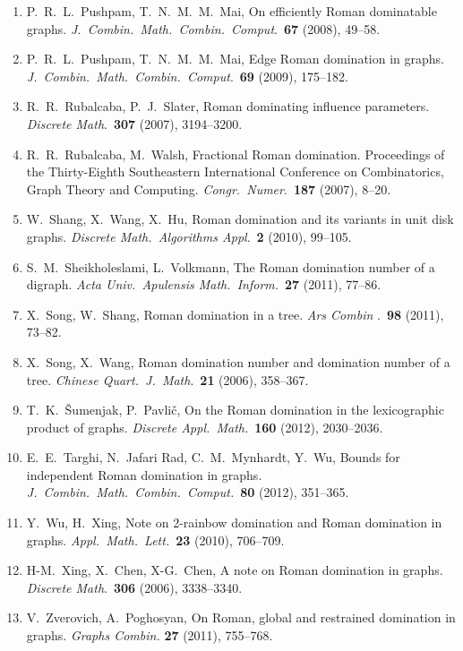 \documentclass[12pt]{article}%
\begin{document}
\begin{enumerate}
\item P.~R.~L.~Pushpam, T.~N.~M.~M.~Mai, On efficiently Roman dominatable
graphs. \emph{J.~Combin.~Math.~Combin.~Comput}.~\textbf{67} (2008), 49--58.

\item P.~R.~L.~Pushpam, T.~N.~M.~M.~Mai, Edge Roman domination in graphs.
\emph{J.~Combin.~Math.~Combin.~Comput}.~\textbf{69} (2009), 175--182.

\item R.~R.~Rubalcaba, P.~J.~Slater, Roman dominating influence parameters.
\emph{Discrete Math}.~\textbf{307} (2007), 3194--3200.

\item R.~R.~Rubalcaba, M.~Walsh, Fractional Roman domination. Proceedings of
the Thirty-Eighth Southeastern International Conference on Combinatorics,
Graph Theory and Computing. \emph{Congr.~Numer}.~\textbf{187} (2007), 8--20.

\item W.~Shang, X.~Wang, X.~Hu, Roman domination and its variants in unit disk
graphs. \emph{Discrete Math.~Algorithms Appl}.~\textbf{2} (2010), 99--105.

\item S.~M.~Sheikholeslami, L.~Volkmann, The Roman domination number of a
digraph. \emph{Acta Univ.~Apulensis Math.~Inform.}~\textbf{27} (2011), 77--86.

\item X.~Song, W.~Shang, Roman domination in a tree. \emph{Ars Combin}%
.~\textbf{98} (2011), 73--82.

\item X.~Song, X.~Wang, Roman domination number and domination number of a
tree. \emph{Chinese Quart.~J.~Math}.~\textbf{21} (2006), 358--367.

\item T.~K.~\v{S}umenjak, P.~Pavli\v{c}, On the Roman domination in the
lexicographic product of graphs. \emph{Discrete Appl.~Math.}~\textbf{160}
(2012), 2030--2036.

\item E.~E.~Targhi, N.~Jafari Rad, C.~M.~Mynhardt, Y.~Wu, Bounds for
independent Roman domination in graphs.
\emph{J.~Combin.~Math.~Combin.~Comput.}~\textbf{80} (2012), 351--365.

\item Y.~Wu, H.~Xing, Note on 2-rainbow domination and Roman domination in
graphs. \emph{Appl.~Math.~Lett.}~\textbf{23} (2010), 706--709.

\item H-M.~Xing, X.~Chen, X-G.~Chen, A note on Roman domination in graphs.
\emph{Discrete Math}.~\textbf{306} (2006), 3338--3340.

\item V.~Zverovich, A.~Poghosyan, On Roman, global and restrained domination
in graphs. \emph{Graphs Combin.} \textbf{27} (2011), 755--768.
\end{enumerate}
\end{document}
